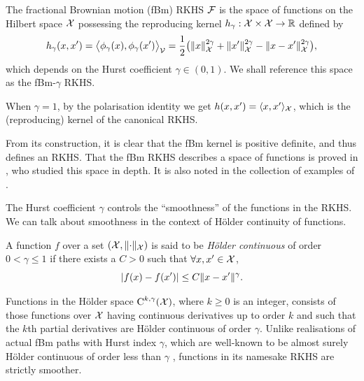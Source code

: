 \begin{definition}\label{def:fbmrkhs}
  \hspace{-1.7pt}The fractional Brownian motion (fBm) RKHS ${\mathcal F}$ is the space of functions on the Hilbert space ${\mathcal X}$ possessing the reproducing kernel $h_\gamma:{\mathcal X}\times{\mathcal X}\to\mathbb{R}$ defined by
  \[
    h_\gamma(x,x') = \big\langle \phi_\gamma(x), \phi_\gamma(x') \big\rangle_{\mathcal V} = \frac{1}{2}\big( \lVert x\rVert_{\mathcal X}^{2\gamma} + \lVert x'\rVert_{\mathcal X}^{2\gamma} - \lVert x-x'\rVert_{\mathcal X}^{2\gamma} \big),
  \]
  which depends on the Hurst coefficient $\gamma \in (0,1)$.
  We shall reference this space as the fBm-$\gamma$ RKHS.
\end{definition}

\begin{remark}
  When $\gamma=1$, by the polarisation identity we get $h(x,x') = \langle x,x'\rangle_{\mathcal X}$, which is the (reproducing) kernel of the canonical RKHS.
\end{remark}

From its construction, it is clear that the fBm kernel is positive definite, and thus defines an RKHS.
That the fBm RKHS describes a space of functions is proved in \citet{cohen2002}, who studied this space in depth. 
It is also noted in the collection of examples of \citet[pp.71 \& 319]{berlinet2011reproducing}.

The Hurst coefficient $\gamma$ controls the ``smoothness'' of the functions in the RKHS. 
We can talk about smoothness in the context of Hölder continuity of functions.

\begin{definition}
  A function $f$ over a set $({\mathcal X}, \lVert\cdot\rVert_{\mathcal X})$ is said to be \emph{Hölder continuous} of order $0 <\gamma\leq 1$ if there exists a $C>0$ such that $\forall x,x'\in{\mathcal X}$,
  \[
    \vert f(x) - f(x') \vert \leq C \lVert x-x'\rVert^\gamma.
  \]
\end{definition}

Functions in the Hölder space $\text{C}^{k,\gamma}({\mathcal X})$, where $k\geq 0$ is an integer, consists of those functions over ${\mathcal X}$ having continuous derivatives up to order $k$ and such that the $k$th partial derivatives are Hölder continuous of order $\gamma$.
Unlike realisations of actual fBm paths with Hurst index $\gamma$, which are well-known to be almost surely Hölder continuous of order less than $\gamma$ \citep[Theorem 4.1.1]{embrechts2002selfsimilar}, functions in its namesake RKHS are strictly smoother.


